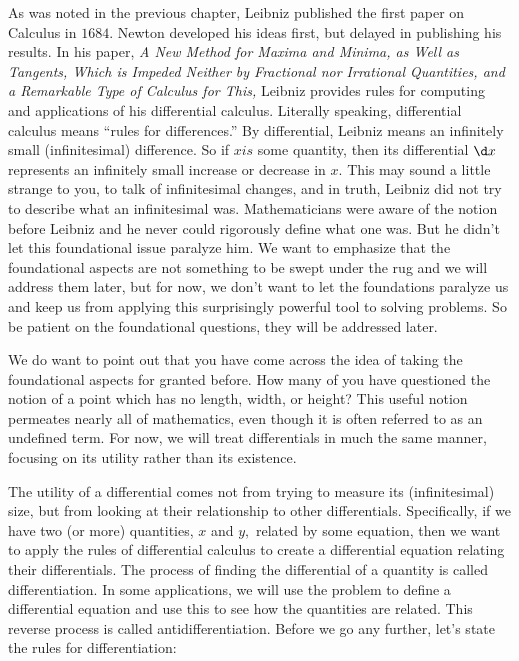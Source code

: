 As was noted in the previous chapter, Leibniz published the first
paper on Calculus in $1684.$  Newton developed his ideas first, but
delayed in publishing his results.  In his paper, {\it{}A New Method for
Maxima and Minima, as Well as Tangents, Which is Impeded Neither by
Fractional nor Irrational Quantities, and a Remarkable Type of
Calculus for This,} Leibniz provides rules for computing and
applications of his differential calculus.  Literally speaking,
differential calculus means ``rules for differences.''  By differential,
Leibniz means an infinitely small (infinitesimal) difference.  So if $x
is$ some quantity, then its differential $\d x$ represents an infinitely
small increase or decrease in $x.$  This may sound a little strange to
you, to talk of infinitesimal changes, and in truth, Leibniz did not
try to describe what an infinitesimal was.  Mathematicians were aware
of the notion before Leibniz and he never could rigorously define what
one was.  But he didn't let this foundational issue paralyze him.  We
want to emphasize that the foundational aspects are not something to
be swept under the rug and we will address them later, but for now, we
don't want to let the foundations paralyze us and keep us from
applying this surprisingly powerful tool to solving problems.  So be
patient on the foundational questions, they will be addressed later.

We do want to point out that you have come across the idea of taking
the foundational aspects for granted before.  How many of you have
questioned the notion of a point which has no length, width, or
height?  This useful notion permeates nearly all of mathematics, even
though it is often referred to as an undefined term.  For now, we will
treat differentials in much the same manner, focusing on its utility
rather than its existence.

The utility of a differential comes not from trying to measure its
(infinitesimal) size, but from looking at their relationship to other
differentials.  Specifically, if we have two (or more) quantities, $x$
and $y,$ related by some equation, then we want to apply the rules of
differential calculus to create a differential equation relating their
differentials.  The process of finding the differential of a quantity
is called differentiation.  In some applications, we will use the
problem to define a differential equation and use this to see how the
quantities are related. This reverse process is called
antidifferentiation.  Before we go any further, let's state the rules
for differentiation:

